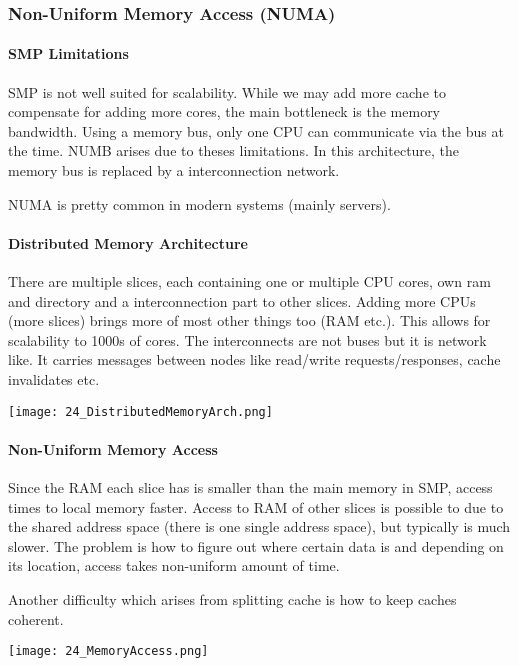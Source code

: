 

\subsubsection{Non-Uniform Memory Access (NUMA)}
\paragraph{SMP Limitations}
SMP is not well suited for scalability. While we may add more cache to compensate for adding more cores, the main bottleneck is the memory bandwidth. Using a memory bus, only one CPU can communicate via the bus at the time. NUMB arises due to theses limitations. In this architecture, the memory bus is replaced by a interconnection network.

NUMA is pretty common in modern systems (mainly servers).

\paragraph{Distributed Memory Architecture}
There are multiple slices, each containing one or multiple CPU cores, own ram and directory and a interconnection part to other slices. Adding more CPUs (more slices) brings more of most other things too (RAM etc.). This allows for scalability to 1000s of cores. The interconnects are not buses but it is network like. It carries messages between nodes like read/write requests/responses, cache invalidates etc.

\texttt{[image: 24\_DistributedMemoryArch.png]}

\paragraph{Non-Uniform Memory Access}
Since the RAM each slice has is smaller than the main memory in SMP, access times to local memory faster. Access to RAM of other slices is possible to due to the shared address space (there is one single address space), but typically is much slower. The problem is how to figure out where certain data is and depending on its location, access takes non-uniform amount of time.

Another difficulty which arises from splitting cache is how to keep caches coherent.

\texttt{[image: 24\_MemoryAccess.png]}

